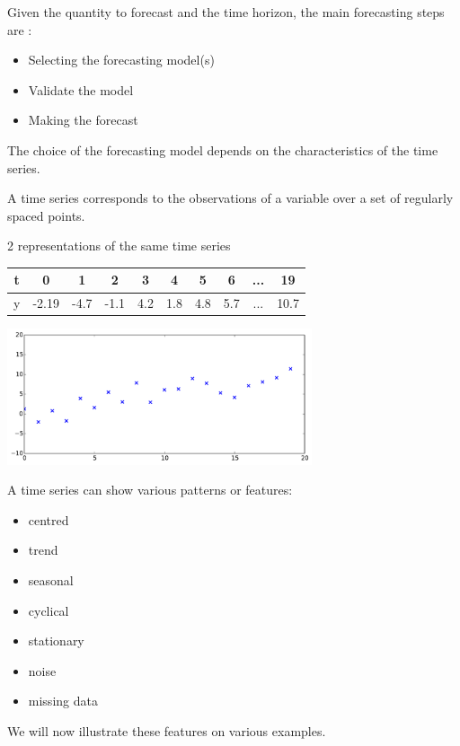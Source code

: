 \documentclass{beamer}
\begin{document}
\begin{frame}{}
Given the quantity to forecast and the time horizon, the main forecasting steps are :
\begin{itemize}
	\item Selecting the forecasting model(s)
	\item Validate the model
	\item Making the forecast
\end{itemize}
\vspace{5mm}
The choice of the forecasting model depends on the characteristics of the time series.

\end{frame}

\begin{frame}{}
A time series corresponds to the observations of a variable over a set of regularly spaced points.\\
\begin{example}
 2 representations of the same time series
\begin{center}
  \begin{tabular}{|c|ccccccccc|}
  \hline
  t 	& 0		&  1 	&  2 	&   3 	&  4 	& 5 	& 6 	& ... 	& 19   \\ \hline
  y		&-2.19	&  -4.7	&  -1.1 &   4.2 &   1.8 &   4.8 &   5.7 & ... 	& 10.7 \\ \hline
  \end{tabular}
  \includegraphics[height=4cm]{figures/2_example}
\end{center}
\end{example}
\end{frame}

\begin{frame}{}
A time series can show various patterns or features:
\begin{itemize}
	\item centred 
	\item trend
	\item seasonal
	\item cyclical
	\item stationary
	\item noise
	\item missing data
\end{itemize}
\vspace{2mm}
We will now illustrate these features on various examples.
\end{frame}
\end{document}
